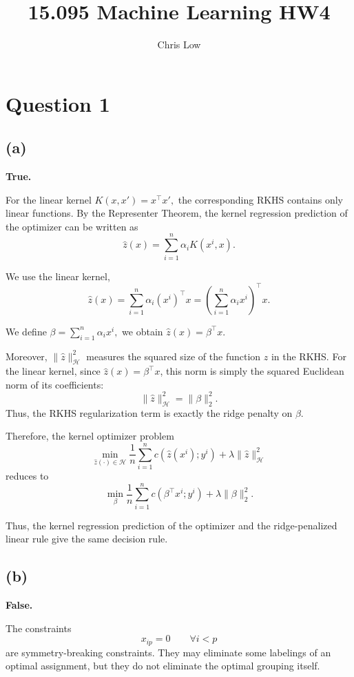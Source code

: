\documentclass{article}
\title{15.095 Machine Learning HW4}
\author{Chris Low}
\date{} %
\begin{document}
\maketitle

\section*{Question 1}

\subsection*{(a)}

\textbf{True.}

For the linear kernel $
K(x,x') = x^\top x',
$ the corresponding RKHS contains only linear functions. By the Representer Theorem, the kernel regression prediction of the optimizer can be written as
\[
\hat{z}(x) = \sum_{i=1}^{n} \alpha_i K(x^i,x).
\]

We use the linear kernel,
\[
\hat{z}(x)
= \sum_{i=1}^{n} \alpha_i (x^i)^\top x
= \left(\sum_{i=1}^{n} \alpha_i x^i\right)^\top x.
\]

We define $
\beta = \sum_{i=1}^{n} \alpha_i x^i,
$ we obtain $
\hat{z}(x) = \beta^\top x.
$

Moreover, $\|\hat{z}\|_{\mathcal{H}}^2$ measures the squared size of the function $\hat{z}$ in the RKHS. For the linear kernel, since $\hat{z}(x)=\beta^\top x$, this norm is simply the squared Euclidean norm of its coefficients:
\[
\|\hat{z}\|_{\mathcal{H}}^2 = \|\beta\|_2^2.
\]
Thus, the RKHS regularization term is exactly the ridge penalty on $\beta$.

Therefore, the kernel optimizer problem
\[
\min_{\hat{z}(\cdot)\in\mathcal{H}}
\frac{1}{n}\sum_{i=1}^{n} c(\hat{z}(x^i);y^i)
+ \lambda \|\hat{z}\|_{\mathcal{H}}^2
\]
reduces to
\[
\min_{\beta}
\frac{1}{n}\sum_{i=1}^{n} c(\beta^\top x^i;y^i)
+ \lambda\|\beta\|_2^2.
\]

Thus, the kernel regression prediction of the optimizer and the ridge-penalized linear rule give the same decision rule.


\vspace{5mm}
\subsection*{(b)}

\textbf{False.}

The constraints
\[
x_{ip} = 0 \qquad \forall i < p
\]
are symmetry-breaking constraints. They may eliminate some labelings of an optimal assignment, but they do not eliminate the optimal grouping itself.
\end{document}
